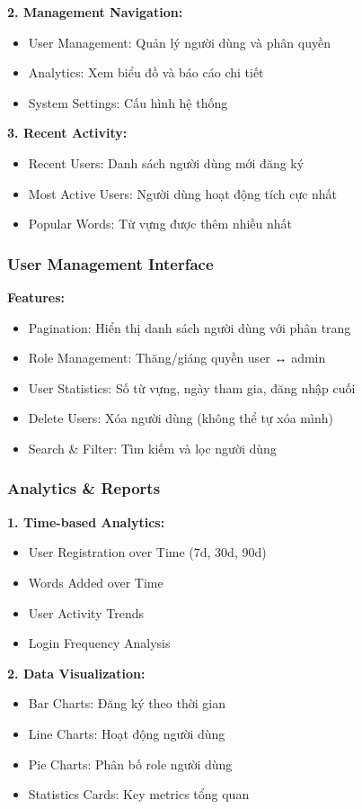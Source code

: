 \documentclass[12pt,a4paper]{article}
\begin{document}
\textbf{2. Management Navigation:}
\begin{itemize}
    \item User Management: Quản lý người dùng và phân quyền
    \item Analytics: Xem biểu đồ và báo cáo chi tiết
    \item System Settings: Cấu hình hệ thống
\end{itemize}

\textbf{3. Recent Activity:}
\begin{itemize}
    \item Recent Users: Danh sách người dùng mới đăng ký
    \item Most Active Users: Người dùng hoạt động tích cực nhất
    \item Popular Words: Từ vựng được thêm nhiều nhất
\end{itemize}

\subsubsection{User Management Interface}

\textbf{Features:}
\begin{itemize}
    \item Pagination: Hiển thị danh sách người dùng với phân trang
    \item Role Management: Thăng/giáng quyền user ↔ admin
    \item User Statistics: Số từ vựng, ngày tham gia, đăng nhập cuối
    \item Delete Users: Xóa người dùng (không thể tự xóa mình)
    \item Search \& Filter: Tìm kiếm và lọc người dùng
\end{itemize}

\subsubsection{Analytics \& Reports}

\textbf{1. Time-based Analytics:}
\begin{itemize}
    \item User Registration over Time (7d, 30d, 90d)
    \item Words Added over Time
    \item User Activity Trends
    \item Login Frequency Analysis
\end{itemize}

\textbf{2. Data Visualization:}
\begin{itemize}
    \item Bar Charts: Đăng ký theo thời gian
    \item Line Charts: Hoạt động người dùng
    \item Pie Charts: Phân bố role người dùng
    \item Statistics Cards: Key metrics tổng quan
\end{itemize}
\end{document}
